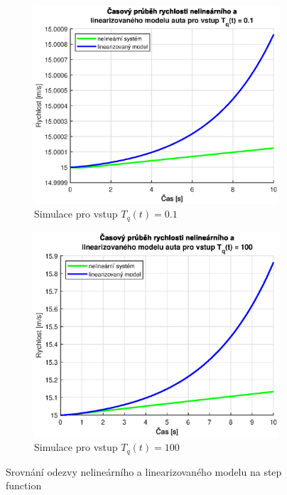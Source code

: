 \documentclass[twoside]{article}
\begin{document}
\begin{figure}[htbp]
    \centering %
\begin{subfigure}{0.45\textwidth}
  \includegraphics[width=\linewidth]{uloha12-01.eps}
  \caption{Simulace pro vstup $T_q(t) = 0.1$}
\end{subfigure}\hfil %
\begin{subfigure}{0.45\textwidth}
	\includegraphics[width=\linewidth]{uloha12-100.eps}
	\caption{Simulace pro vstup $T_q(t) = 100$}
\end{subfigure}
\caption{Srovnání odezvy nelineárního a linearizovaného modelu na step function}
\label{fig:nelin-100}
\end{figure}
\end{document}
